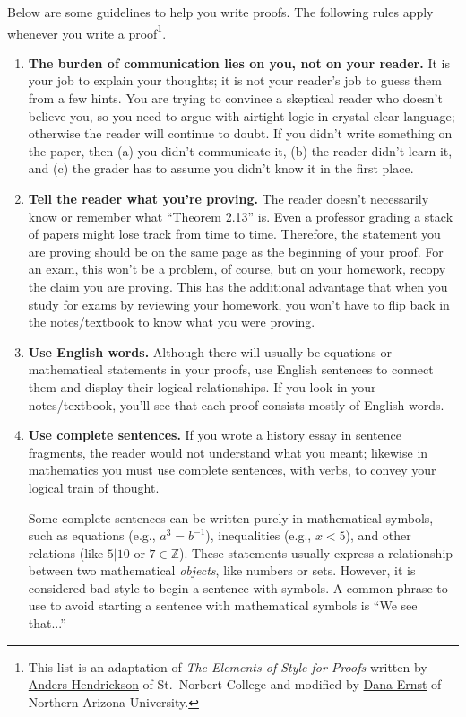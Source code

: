 Below are some guidelines to help you write proofs. 
The following rules apply whenever you write a proof\footnote{
	This list is an adaptation of \emph{The Elements of Style for Proofs} written by \href{http://home.snc.edu/andershendrickson/}{Anders Hendrickson} of St.~Norbert College
	and modified by \href{http://danaernst.com/}{Dana Ernst} of Northern Arizona University.
	}.

\begin{enumerate}

\item \textbf{The burden of communication lies on you, not on your reader.}
	It is your job to explain your thoughts;
	it is not your reader's job to guess them from a few hints.
	You are trying to convince a skeptical reader who doesn't believe you,
	so you need to argue with airtight logic in crystal clear language;
	otherwise the reader will continue to doubt.
	If you didn't write something on the paper, then
	  (a) you didn't communicate it,
	  (b) the reader didn't learn it, and
	  (c) the grader has to assume you didn't know it in the first place.
	  
\item \textbf{Tell the reader what you're proving.}
	The reader doesn't necessarily know or remember what ``Theorem 2.13'' is.
	Even a professor grading a stack of papers might lose track from time to time.
	Therefore, the statement you are proving should be on the same page as the beginning of your proof.
	For an exam, this won't be a problem, of course,
	but on your homework, recopy the claim you are proving.
	This has the additional advantage that when you study for exams by reviewing your homework,
	you won't have to flip back in the notes/textbook to know what you were proving.

\item \textbf{Use English words.}
	Although there will usually be equations or mathematical statements in your proofs,
	use English sentences to connect them and display their logical relationships.
	If you look in your notes/textbook, you'll see that each proof consists mostly of English words.

\item \textbf{Use complete sentences.}
	If you wrote a history essay in sentence fragments,
	the reader would not understand what you meant;
	likewise in mathematics you must use complete sentences, with verbs,
	to convey your logical train of thought.
	
	Some complete sentences can be written purely in mathematical symbols, 
	such as 
	  equations (e.g., $a^3=b^{-1}$),
	  inequalities (e.g., $x<5$),
	  and other relations (like $5\big|10$ or $7\in\mathbb{Z}$).
	These statements usually express a relationship between two mathematical \emph{objects},
	like numbers or sets.  However, it is considered bad style to begin a sentence with symbols.  A common phrase to use to avoid starting a sentence with mathematical symbols is ``We see that...''


\end{enumerate}
